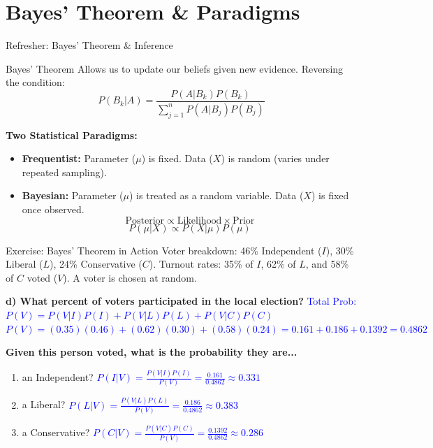 \documentclass[aspectratio=169]{beamer}
\begin{document}
\section{Bayes' Theorem \& Paradigms}

\begin{frame}{Refresher: Bayes' Theorem \& Inference}
    \begin{block}{Bayes' Theorem}
        Allows us to update our beliefs given new evidence. Reversing the condition:
        $$ P(B_k | A) = \frac{P(A|B_k)P(B_k)}{\sum_{j=1}^{n} P(A|B_j)P(B_j)} $$
    \end{block}
    
    \vspace{0.2cm}
    \textbf{Two Statistical Paradigms:}
    \begin{itemize}
        \item \textbf{Frequentist:} Parameter ($\mu$) is fixed. Data ($X$) is random (varies under repeated sampling).
        \item \textbf{Bayesian:} Parameter ($\mu$) is treated as a random variable. Data ($X$) is fixed once observed. 
        $$ \text{Posterior} \propto \text{Likelihood} \times \text{Prior} $$
        $$ P(\mu | X) \propto P(X|\mu)P(\mu) $$
    \end{itemize}
\end{frame}

\begin{frame}{Exercise: Bayes' Theorem in Action}
    \small
    Voter breakdown: 46\% Independent ($I$), 30\% Liberal ($L$), 24\% Conservative ($C$). 
    Turnout rates: 35\% of $I$, 62\% of $L$, and 58\% of $C$ voted ($V$). A voter is chosen at random.
    \pause
    
    \vspace{0.2cm}
    \textbf{d) What percent of voters participated in the local election?} \pause
    \newline \textcolor{blue}{Total Prob: $P(V) = P(V|I)P(I) + P(V|L)P(L) + P(V|C)P(C)$}
    \newline \textcolor{blue}{$P(V) = (0.35)(0.46) + (0.62)(0.30) + (0.58)(0.24) = 0.161 + 0.186 + 0.1392 = 0.4862$} \pause
    
    \vspace{0.2cm}
    \textbf{Given this person voted, what is the probability they are...}
    \begin{enumerate}
        \item an Independent? \pause \textcolor{blue}{$P(I|V) = \frac{P(V|I)P(I)}{P(V)} = \frac{0.161}{0.4862} \approx 0.331$} \pause
        \item a Liberal? \pause \textcolor{blue}{$P(L|V) = \frac{P(V|L)P(L)}{P(V)} = \frac{0.186}{0.4862} \approx 0.383$} \pause
        \item a Conservative? \pause \textcolor{blue}{$P(C|V) = \frac{P(V|C)P(C)}{P(V)} = \frac{0.1392}{0.4862} \approx 0.286$}
    \end{enumerate}
\end{frame}
\end{document}
